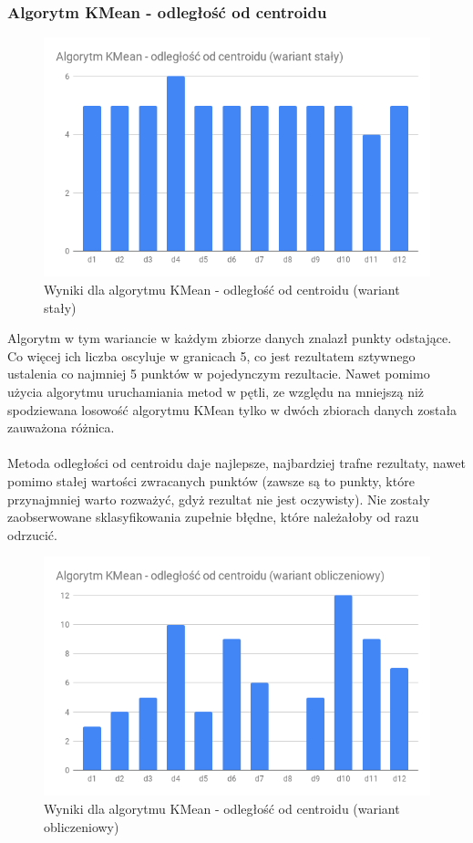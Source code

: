 \documentclass[eng,printmode]{mgr}
\begin{document}
\subsubsection{Algorytm KMean - odległość od centroidu}
\begin{figure}[H]
  \begin{center}
  \includegraphics[scale=0.7]{r_dist_f}
  \end{center}
  \caption{Wyniki dla algorytmu KMean - odległość od centroidu (wariant stały)}
  \label{fig:r_dist_f}
\end{figure}
Algorytm w tym wariancie w każdym zbiorze danych znalazł punkty odstające. Co więcej ich liczba oscyluje w granicach 5, co jest rezultatem sztywnego ustalenia co najmniej 5 punktów w pojedynczym rezultacie. Nawet pomimo użycia algorytmu uruchamiania metod w pętli, ze względu na mniejszą niż spodziewana losowość algorytmu KMean tylko w dwóch zbiorach danych została zauważona różnica.
\\\\
Metoda odległości od centroidu daje najlepsze, najbardziej trafne rezultaty, nawet pomimo stałej wartości zwracanych punktów (zawsze są to punkty, które przynajmniej warto rozważyć, gdyż rezultat nie jest oczywisty). Nie zostały zaobserwowane sklasyfikowania zupełnie błędne, które należałoby od razu odrzucić.
\\
\begin{figure}[H]
  \begin{center}
  \includegraphics[scale=0.7]{r_dist_c}
  \end{center}
  \caption{Wyniki dla algorytmu KMean - odległość od centroidu (wariant obliczeniowy)}
  \label{fig:r_dist_c}
\end{figure}
\end{document}
